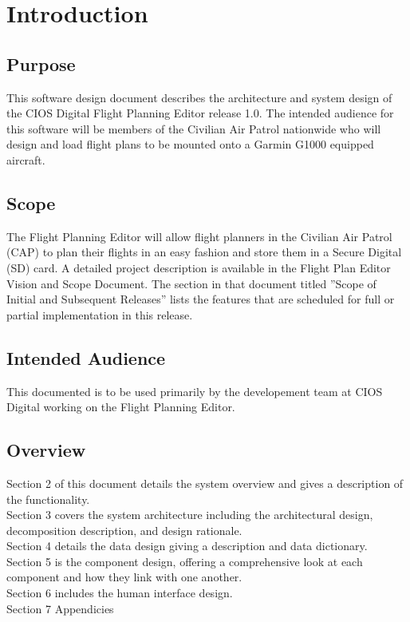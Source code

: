 \documentclass[12pt, letterpaper]{article}
\begin{document}
\newpage


\section{Introduction}
  \subsection{Purpose}
    This software design document describes the architecture and system design of the CIOS Digital Flight Planning Editor release 1.0.
    The intended audience for this software will be members of the Civilian Air Patrol nationwide who will design and load flight plans to be mounted onto a Garmin G1000 equipped aircraft.

\subsection{Scope}
  The Flight Planning Editor will allow flight planners in the Civilian Air Patrol (CAP) to plan their flights in an easy fashion and store them in a Secure Digital (SD) card. A detailed project description is available in the Flight Plan Editor Vision and Scope Document. The section in that document titled ”Scope of Initial and Subsequent Releases” lists the features that are scheduled for full or partial implementation in this release.

  \subsection{Intended Audience}
This documented is to be used primarily by the developement team at CIOS Digital working on the Flight Planning Editor.

  \subsection{Overview}
Section 2 of this document details the system overview and gives a description of the functionality. \\
Section 3 covers the system architecture including the architectural design, decomposition description, and design rationale. \\
Section 4 details the data design giving a description and data dictionary. \\
Section 5 is the component design, offering a comprehensive look at each component and how they link with one another. \\
Section 6 includes the human interface design. \\
Section 7 Appendicies \\
\end{document}
